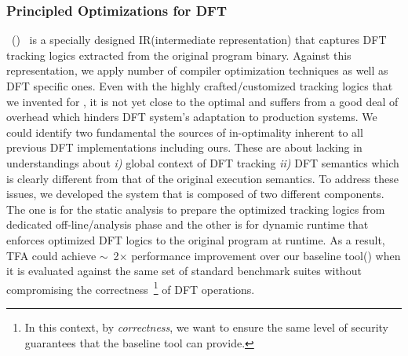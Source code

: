 \documentclass[letterpaper, 10pt]{article}
\begin{document}
\begin{small}
\subsubsection*{Principled Optimizations for DFT}

\TFAFull~(\TFA)~\cite{tfa:2012ndss} is a specially designed IR(intermediate
representation) that captures DFT tracking logics extracted from the original
program binary. Against this representation, we apply number of compiler
optimization techniques as well as DFT specific ones.
%
Even with the highly crafted/customized tracking logics that we invented for
\libdft, it is not yet close to the optimal and suffers from a good deal of
overhead which hinders DFT system's adaptation to production systems. We could
identify two fundamental the sources of in-optimality inherent to all
previous DFT implementations including ours. These are about lacking in
understandings about {\it i)} global context of DFT tracking {\it ii)} DFT
semantics which is clearly different from that of the original execution
semantics.
%
To address these issues, we developed the system that is composed of two
different components. The one is for the static analysis to prepare the
optimized tracking logics from dedicated off-line/analysis phase and the other
is for dynamic runtime that enforces optimized DFT logics to the original
program  at runtime.
%
As a result, TFA could achieve \(\sim\)~2\(\times\) performance improvement
over  our baseline tool(\libdft) when it is evaluated against the same set of
standard benchmark suites without compromising the correctness~\footnote{In
        this context, by {\it correctness}, we want to ensure the same level of
security guarantees that the baseline tool \libdft can provide.} of DFT
operations.


\end{small}
\end{document}
